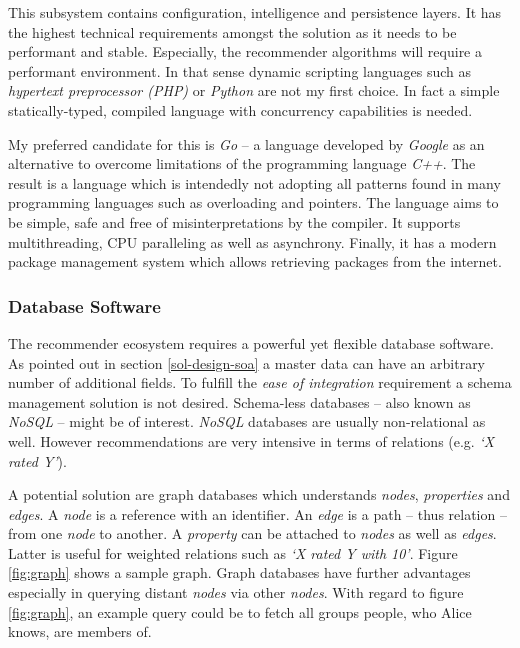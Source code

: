 This subsystem contains configuration, intelligence and persistence layers. It has the highest technical requirements amongst the solution as it needs to be performant and stable. Especially, the recommender algorithms will require a performant environment. In that sense dynamic scripting languages such as \emph{hypertext preprocessor (PHP)} or \emph{Python} are not my first choice. In fact a simple statically-typed, compiled language with concurrency capabilities is needed. 

My preferred candidate for this is \emph{Go} -- a language developed by \emph{Google} as an alternative to overcome limitations of the programming language \emph{C++}. The result is a language which is intendedly not adopting all patterns found in many programming languages such as overloading and pointers. The language aims to be simple, safe and free of misinterpretations by the compiler. It supports multithreading, CPU paralleling as well as asynchrony. Finally, it has a modern package management system which allows retrieving packages from the internet.

\subsubsection{Database Software}

The recommender ecosystem requires a powerful yet flexible database software. As pointed out in section \ref{sol-design-soa} a master data can have an arbitrary number of additional fields. To fulfill the \emph{ease of integration} requirement a schema management solution is not desired. Schema-less databases -- also known as \emph{NoSQL} -- might be of interest. \emph{NoSQL} databases are usually non-relational as well. However recommendations are very intensive in terms of relations (e.g. \emph{`X rated Y'}).

A potential solution are graph databases which understands \emph{nodes}, \emph{properties} and \emph{edges}. A \emph{node} is a reference with an identifier. An \emph{edge} is a path -- thus relation -- from one \emph{node} to another. A \emph{property} can be attached to \emph{nodes} as well as \emph{edges}. Latter is useful for weighted relations such as \emph{`X rated Y with 10'}. Figure \ref{fig:graph} shows a sample graph. Graph databases have further advantages especially in querying distant \emph{nodes} via other \emph{nodes}. With regard to figure \ref{fig:graph}, an example query could be to fetch all groups people, who Alice knows, are members of.

